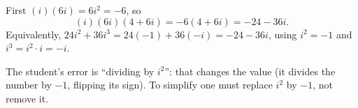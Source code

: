 First $(i)(6i)=6i^2=-6$, so
\[
(i)(6i)(4+6i)=-6(4+6i)=\boxed{-24-36i}.
\]
Equivalently, $24i^2+36i^3=24(-1)+36(-i)=-24-36i$, using $i^2=-1$ and $i^3=i^2\cdot i=-i$.

The student's error is ``dividing by $i^2$'': that changes the value (it divides the number by $-1$, flipping its sign). To simplify one must replace $i^2$ by $-1$, not remove it.
